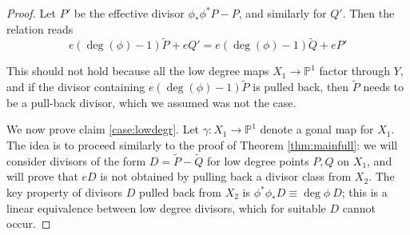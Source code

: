 \documentclass[11pt]{amsart}
\newcommand{\PP}{\mathbb{P}}
\theoremstyle{definition}
\theoremstyle{remark}
\begin{document}
\begin{proof}
    Let $P'$ be the effective divisor $\phi_*\phi^*P - P$, and similarly for $Q'$. Then the relation reads
    \[e(\deg(\phi)-1)\tilde{P} + eQ' = e(\deg(\phi)-1)\tilde{Q} + eP' \]


    
    This should not hold because all the low degree maps $X_1 \to \PP^1$ factor through $Y$, and if the divisor containing $e(\deg(\phi)-1)\tilde{P}$ is pulled back, then $\tilde{P}$ needs to be a pull-back divisor, which we assumed was not the case.
    \fi

    
We now prove claim \eqref{case:lowdegr}. Let $\gamma: X_1 \to \PP^1$ denote a gonal map for $X_1$. The idea is to proceed similarly to the proof of Theorem \ref{thm:mainfull}: we will consider divisors of the form $D=\tilde{P}-\tilde{Q}$ for low degree points $P, Q$ on $X_1$, and will prove that $eD$ is not obtained by pulling back a divisor class from $X_2$. The key property of divisors $D$ pulled back from $X_2$ is $\phi^*\phi_* D \equiv \deg \phi \ D$; this is a linear equivalence between low degree divisors, which for suitable $D$ cannot occur.


\end{proof}
\end{document}

